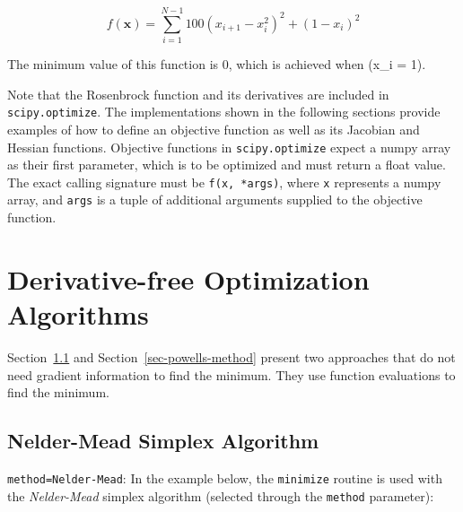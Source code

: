 \documentclass[
  letterpaper,
  DIV=11,
  numbers=noendperiod]{scrreprt}
\begin{document}
\[
f(\mathbf{x}) = \sum_{i=1}^{N-1} 100 (x_{i+1} - x_i^2)^2 + (1 - x_i)^2
\]

The minimum value of this function is 0, which is achieved when (x\_i =
1).

Note that the Rosenbrock function and its derivatives are included in
\texttt{scipy.optimize}. The implementations shown in the following
sections provide examples of how to define an objective function as well
as its Jacobian and Hessian functions. Objective functions in
\texttt{scipy.optimize} expect a numpy array as their first parameter,
which is to be optimized and must return a float value. The exact
calling signature must be \texttt{f(x,\ *args)}, where \texttt{x}
represents a numpy array, and \texttt{args} is a tuple of additional
arguments supplied to the objective function.

\hypertarget{derivative-free-optimization-algorithms}{%
\section{Derivative-free Optimization
Algorithms}\label{derivative-free-optimization-algorithms}}

Section~\ref{sec-nelder-mead-simplex-algorithm} and
Section~\ref{sec-powells-method} present two approaches that do not need
gradient information to find the minimum. They use function evaluations
to find the minimum.

\hypertarget{sec-nelder-mead-simplex-algorithm}{%
\subsection{Nelder-Mead Simplex
Algorithm}\label{sec-nelder-mead-simplex-algorithm}}

\texttt{method=\textquotesingle{}Nelder-Mead\textquotesingle{}}: In the
example below, the \texttt{minimize} routine is used with the
\emph{Nelder-Mead} simplex algorithm (selected through the
\texttt{method} parameter):
\end{document}
